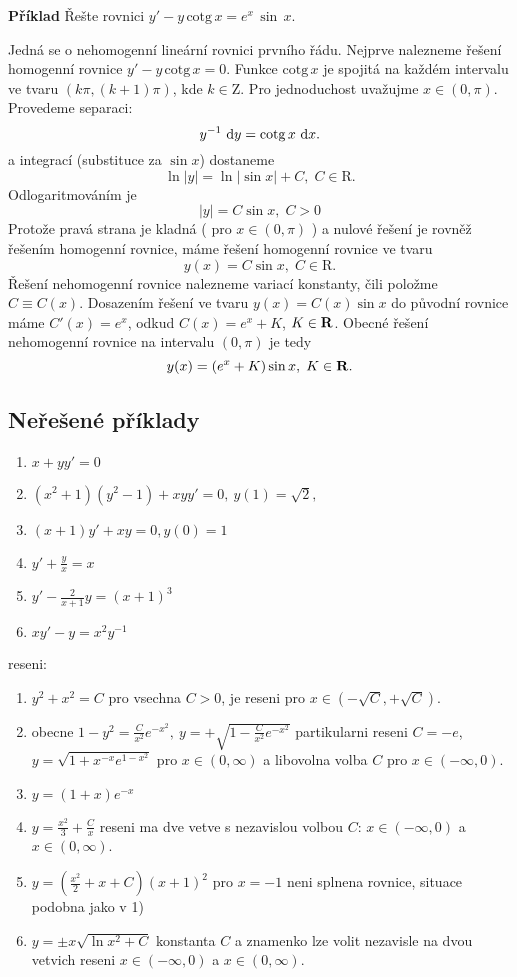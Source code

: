 \documentclass[a4paper,10pt]{book}
\DeclareMathOperator{\cotg}{cotg}
\def\Real{{\rm\bf R}}
\def\d{\,{\rm d}}               %
\begin{document}
   {\bf Příklad}
   Řešte rovnici $y'-y\,\mathrm{cotg}\,x=e^x\,\sin\,x$.
   
   Jedná se o nehomogenní lineární rovnici prvního řádu.
   Nejprve nalezneme řešení homogenní rovnice $y'-y\,\mathrm{cotg}\,x=0$.
   Funkce $\mathrm{cotg}\,x$ je spojitá na každém intervalu ve tvaru
   $(k\pi,(k+1)\pi)$, kde $k\in\mathrm{Z}$.
   Pro jednoduchost uvažujme $x\in(0,\pi)$.
   Provedeme separaci:
   \[
    	y^{-1}\,\d y=\cotg x\,\d x.
   \]
   a integrací (substituce za $\sin x$) dostaneme
   \[
      \ln |y| = \ln |\sin x|+C, \; C\in\mathrm{R}.
   \]
   Odlogaritmováním je
   \[
      |y| = C\sin x, \; C>0
   \]
   Protože pravá strana je kladná ( pro $x\in(0,\pi)$ ) a nulové řešení je rovněž řešením homogenní rovnice,
   máme řešení homogenní rovnice ve tvaru
   \[
      y(x) = C\sin x,\; C\in\mathrm{R}.
   \]
   Řešení nehomogenní rovnice nalezneme variací konstanty, čili položme $C\equiv C(x)$.
   Dosazením řešení ve tvaru $y(x)=C(x)\sin x$ do původní rovnice máme $C'(x) = e^x$,
   odkud $C(x) = e^x+K$, $K\in\Real$.
   Obecné řešení nehomogenní rovnice na intervalu $(0,\pi)$ je tedy
   \[
      y(x) = (e^x+K)\sin x, \; K\in\Real.
   \]


\subsection*{Neřešené příklady}
\begin{enumerate}
  \item 
    $ x+yy'=0 $
  \item 
    $ (x^2 +1)(y^2-1)+ xyy'=0,\ y(1)=\sqrt{2},$
  \item
    $ (x+1)y'+xy=0, y(0)=1$
  \item
    $y'+\frac{y}{x}=x$
  \item
    $y'-\frac{2}{x+1}y=(x+1)^3$
  \item
    $xy'-y=x^2 y^{-1}$
\end{enumerate}
reseni:
\begin{enumerate}
  \item
    $y^2+x^2=C$
    pro vsechna $C>0$, je reseni pro $x\in(-\sqrt C,+\sqrt C)$.
  \item
    obecne
    $ 1-y^2=\frac{C}{x^2}e^{-x^2},\ y=+\sqrt{1-\frac{C}{x^2} e^{-x^2}} $
    partikularni reseni $C=-e$,
    $y=\sqrt{1+x^{-x}e^{1-x^2}}$
     pro $x\in(0,\infty)$ a libovolna volba $C$ pro $x\in(-\infty,0)$.
  \item  
    $y=(1+x)e^{-x}$
  \item
    $y=\frac{x^2}{3}+\frac{C}{x}$
    reseni ma dve vetve s nezavislou volbou $C$: $x\in(-\infty,0)$ a $x\in(0,\infty)$.
  \item
    $y=(\frac{x^2}{2}+x+C)(x+1)^2$
    pro $x=-1$ neni splnena rovnice, situace podobna jako v 1)
  \item
    $y=\pm x\sqrt{\ln x^2+C}$
    konstanta $C$ a znamenko lze volit nezavisle na dvou vetvich reseni
    $x\in (-\infty,0)$ a $x\in (0,\infty)$.
\end{enumerate}
\end{document}

